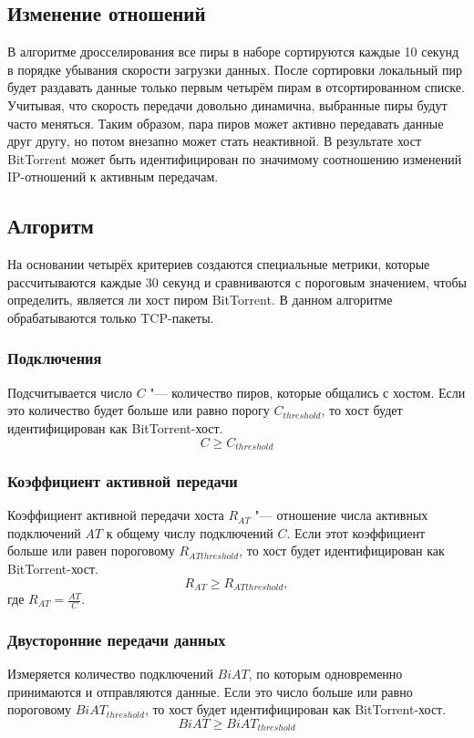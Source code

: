 \documentclass[bachelor, och, coursework]{SCWorks}
\begin{document}
\subsection{Изменение отношений} %
В алгоритме дросселирования все пиры в наборе сортируются каждые 10 секунд в порядке убывания скорости загрузки данных.
После сортировки локальный пир будет раздавать данные только первым четырём пирам в отсортированном списке.
Учитывая, что скорость передачи довольно динамична, выбранные пиры будут часто меняться. Таким образом, пара пиров
может активно передавать данные друг другу, но потом внезапно может стать неактивной. В результате хост BitTorrent может
быть идентифицирован по значимому соотношению изменений IP-отношений к активным передачам.

\subsection{Алгоритм}
На основании четырёх критериев создаются специальные метрики, которые рассчитываются каждые 30 секунд
и сравниваются с пороговым значением, чтобы определить, является ли хост пиром BitTorrent. В данном алгоритме
обрабатываются только TCP-пакеты. 

\subsubsection{Подключения}
Подсчитывается число $C$ "--- количество пиров, которые общались с хостом. Если это количество будет больше или равно порогу $C_{threshold}$, то хост будет идентифицирован как BitTorrent-хост.
\[ C \geq C_{threshold} \]

\subsubsection{Коэффициент активной передачи}
Коэффициент активной передачи хоста $R_{AT}$ "--- отношение числа активных подключений $AT$ к общему числу подключений $C$.
Если этот коэффициент больше или равен пороговому $R_{ATthreshold}$, то хост будет идентифицирован как BitTorrent-хост.
\[ R_{AT} \geq R_{ATthreshold}, \]
где $R_{AT} = \frac{AT}{C}$.

\subsubsection{Двусторонние передачи данных}
Измеряется количество подключений $BiAT$, по которым одновременно принимаются и отправляются данные. 
Если это число больше или равно пороговому $BiAT_{threshold}$, то хост будет идентифицирован как BitTorrent-хост.
\[ BiAT \geq BiAT_{threshold} \]
\end{document}
